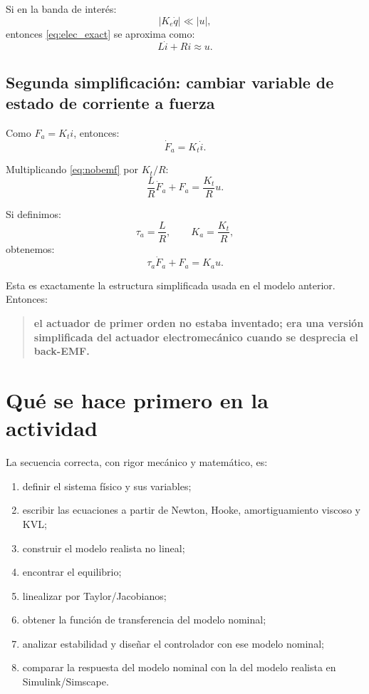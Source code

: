 \documentclass[11pt]{article}
\begin{document}
Si en la banda de inter\'es:
\[
|K_e\dot q| \ll |u|,
\]
entonces \eqref{eq:elec_exact} se aproxima como:
\begin{equation}
L\dot i + Ri \approx u.
\label{eq:nobemf}
\end{equation}

\subsection{Segunda simplificaci\'on: cambiar variable de estado de corriente a fuerza}

Como $F_a=K_t i$, entonces:
\[
\dot F_a = K_t \dot i.
\]

Multiplicando \eqref{eq:nobemf} por $K_t/R$:
\[
\frac{L}{R}\dot F_a + F_a = \frac{K_t}{R}u.
\]

Si definimos:
\begin{equation}
\tau_a = \frac{L}{R},
\qquad
K_a = \frac{K_t}{R},
\label{eq:map}
\end{equation}
obtenemos:
\begin{equation}
\tau_a \dot F_a + F_a = K_a u.
\end{equation}

Esta es exactamente la estructura simplificada usada en el modelo anterior. Entonces:

\begin{quote}
\textbf{el actuador de primer orden no estaba inventado; era una versi\'on simplificada del actuador electromec\'anico cuando se desprecia el back-EMF.}
\end{quote}

\section{Qu\'e se hace primero en la actividad}

La secuencia correcta, con rigor mec\'anico y matem\'atico, es:

\begin{enumerate}[leftmargin=1.2cm]
\item definir el sistema f\'isico y sus variables;
\item escribir las ecuaciones a partir de Newton, Hooke, amortiguamiento viscoso y KVL;
\item construir el modelo realista no lineal;
\item encontrar el equilibrio;
\item linealizar por Taylor/Jacobianos;
\item obtener la funci\'on de transferencia del modelo nominal;
\item analizar estabilidad y dise\~nar el controlador con ese modelo nominal;
\item comparar la respuesta del modelo nominal con la del modelo realista en Simulink/Simscape.
\end{enumerate}
\end{document}
